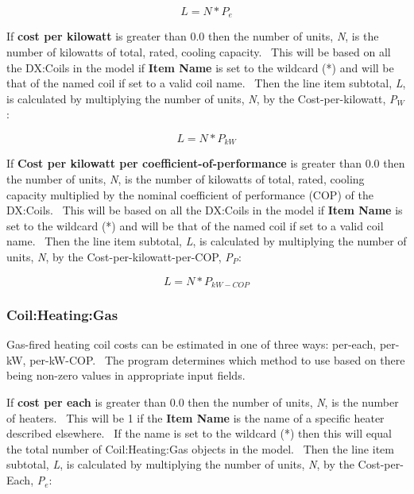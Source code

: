 \begin{equation}
L = N * {P_e}
\end{equation}

If \textbf{cost per kilowatt} is greater than 0.0 then the number of units, \emph{N}, is the number of kilowatts of total, rated, cooling capacity.~ This will be based on all the DX:Coils in the model if \textbf{Item Name} is set to the wildcard (*) and will be that of the named coil if set to a valid coil name.~ Then the line item subtotal, \emph{L}, is calculated by multiplying the number of units, \emph{N}, by the Cost-per-kilowatt, \emph{P\(_{W}\)}:

\begin{equation}
L = N * {P_{kW}}
\end{equation}

If \textbf{Cost per kilowatt per coefficient-of-performance} is greater than 0.0 then the number of units, \emph{N}, is the number of kilowatts of total, rated, cooling capacity multiplied by the nominal coefficient of performance (COP) of the DX:Coils.~ This will be based on all the DX:Coils in the model if \textbf{Item Name} is set to the wildcard (*) and will be that of the named coil if set to a valid coil name.~ Then the line item subtotal, \emph{L}, is calculated by multiplying the number of units, \emph{N}, by the Cost-per-kilowatt-per-COP, \emph{P\(_{P}\)}:

\begin{equation}
L = N * {P_{kW - COP}}
\end{equation}

\subsubsection{Coil:Heating:Gas}\label{coilheatinggas}

Gas-fired heating coil costs can be estimated in one of three ways: per-each, per-kW, per-kW-COP.~ The program determines which method to use based on there being non-zero values in appropriate input fields.

If \textbf{cost per each} is greater than 0.0 then the number of units, \emph{N}, is the number of heaters.~ This will be 1 if the \textbf{Item Name} is the name of a specific heater described elsewhere.~ If the name is set to the wildcard (*) then this will equal the total number of Coil:Heating:Gas objects in the model.~ Then the line item subtotal, \emph{L}, is calculated by multiplying the number of units, \emph{N}, by the Cost-per-Each, \emph{P\(_{e}\)}:

